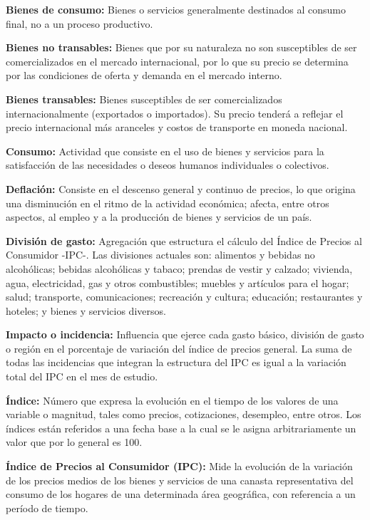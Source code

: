 \textbf{Bienes de consumo:} Bienes o servicios generalmente destinados al consumo final, no a un proceso productivo.

\textbf{Bienes no transables:} Bienes que por su naturaleza no son susceptibles de ser comercializados en el mercado internacional, por lo que su precio se determina por las condiciones de oferta y demanda en el mercado interno.

\textbf{Bienes transables:} Bienes susceptibles de ser comercializados internacionalmente (exportados o importados). Su precio tenderá a reflejar el precio internacional más aranceles y costos de transporte en moneda nacional.

\textbf{Consumo:} Actividad que consiste en el uso de bienes y servicios para la satisfacción de las necesidades o deseos humanos individuales o colectivos.

\textbf{Deflación:} Consiste en el descenso general y continuo de precios, lo que origina una disminución en el ritmo de la actividad económica; afecta, entre otros aspectos, al empleo y a la producción de bienes y servicios de un país.

\textbf{División de gasto:} Agregación que estructura el cálculo del Índice de Precios al Consumidor -IPC-. Las divisiones actuales son: alimentos y bebidas no alcohólicas; bebidas alcohólicas y tabaco; prendas de vestir y calzado; vivienda, agua, electricidad, gas y otros combustibles; muebles y artículos para el hogar; salud; transporte, comunicaciones; recreación y cultura; educación; restaurantes y hoteles; y bienes y servicios diversos.

\textbf{Impacto o incidencia:} Influencia que ejerce cada gasto básico, división de gasto o región en el porcentaje de variación del índice de precios general. La suma de todas las incidencias que integran la estructura del IPC es igual a la variación total del IPC en el mes de estudio.

\textbf{Índice:} Número que expresa la evolución en el tiempo de los valores de una variable o magnitud, tales como precios, cotizaciones, desempleo, entre otros. Los índices están referidos a una fecha base a la cual se le asigna arbitrariamente un valor que por lo general es 100.

\textbf{Índice de Precios al Consumidor (IPC):} Mide la evolución de la variación de los precios medios de los bienes y servicios de una canasta representativa del consumo de los hogares de una determinada área geográfica, con referencia a un período de tiempo.

